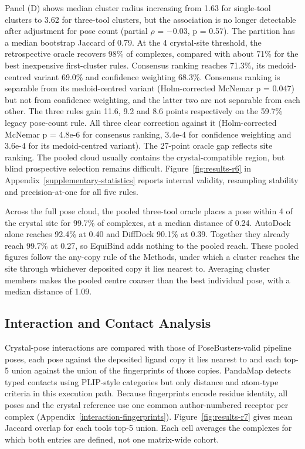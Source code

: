 Panel (D) shows median cluster radius increasing from 1.63\angstrom{} for single-tool clusters to 3.62\angstrom{} for three-tool clusters, but the association is no longer detectable after adjustment for pose count (partial \ensuremath{\rho} = \ensuremath{-}0.03, p = 0.57). The partition has a median bootstrap Jaccard of 0.79. At the 4\angstrom{} crystal-site threshold, the retrospective oracle recovers 98\% of complexes, compared with about 71\% for the best inexpensive first-cluster rules. Consensus ranking reaches 71.3\%, its medoid-centred variant 69.0\% and confidence weighting 68.3\%. Consensus ranking is separable from its medoid-centred variant (Holm-corrected McNemar p = 0.047) but not from confidence weighting, and the latter two are not separable from each other. The three rules gain 11.6, 9.2 and 8.6 points respectively on the 59.7\% legacy pose-count rule. All three clear correction against it (Holm-corrected McNemar p = 4.8e-6 for consensus ranking, 3.4e-4 for confidence weighting and 3.6e-4 for its medoid-centred variant). The 27-point oracle gap reflects site ranking. The pooled cloud usually contains the crystal-compatible region, but blind prospective selection remains difficult. Figure~\ref{fig:results-r6} in Appendix~\ref{supplementary-statistics} reports internal validity, resampling stability and precision-at-one for all five rules.

Across the full pose cloud, the pooled three-tool oracle places a pose within 4\angstrom{} of the crystal site for 99.7\% of complexes, at a median distance of 0.24\angstrom{}. AutoDock alone reaches 92.4\% at 0.40\angstrom{} and DiffDock 90.1\% at 0.39\angstrom{}. Together they already reach 99.7\% at 0.27\angstrom{}, so EquiBind adds nothing to the pooled reach. These pooled figures follow the any-copy rule of the Methods, under which a cluster reaches the site through whichever deposited copy it lies nearest to. Averaging cluster members makes the pooled centre coarser than the best individual pose, with a median distance of 1.09\angstrom{}.

\hypertarget{interaction-and-contact-analysis}{%
\subsection{Interaction and Contact Analysis}\label{interaction-and-contact-analysis}}

Crystal-pose interactions are compared with those of PoseBusters-valid pipeline poses, each pose against the deposited ligand copy it lies nearest to and each top-5 union against the union of the fingerprints of those copies. PandaMap detects typed contacts \cite{ref090} using PLIP-style categories \cite{ref054} but only distance and atom-type criteria in this execution path. Because fingerprints encode residue identity, all poses and the crystal reference use one common author-numbered receptor per complex (Appendix~\ref{interaction-fingerprints}). Figure~\ref{fig:results-r7} gives mean Jaccard overlap for each tool\textquotesingle s top-5 union. Each cell averages the complexes for which both entries are defined, not one matrix-wide cohort.

